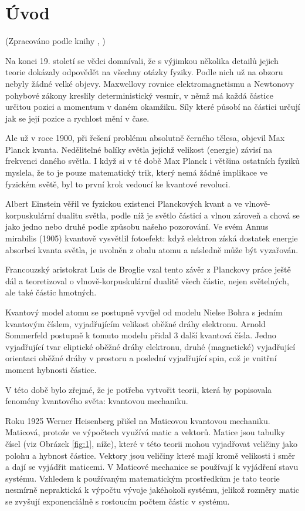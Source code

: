 \section{Úvod}
(Zpracováno podle knihy \citeauthor{quantum}, \citeyear{quantum})

Na konci 19. století se vědci domnívali, že s výjimkou několika detailů jejich teorie dokázaly odpovědět na všechny otázky fyziky. Podle nich už na obzoru nebyly žádné velké objevy. Maxwellovy rovnice elektromagnetismu a Newtonovy pohybové zákony kreslily deterministický vesmír, v němž má každá částice určitou pozici a momentum v daném okamžiku. Síly které působí na částici určují jak se její pozice a rychlost mění v čase.

Ale už v roce 1900, při řešení problému absolutně černého tělesa, objevil Max Planck kvanta. Nedělitelné balíky světla jejichž velikost (energie) závisí na frekvenci daného světla. I když si v té době Max Planck i většina ostatních fyziků myslela, že to je pouze matematický trik, který nemá žádné implikace ve fyzickém světě, byl to první krok vedoucí ke kvantové revoluci.

Albert Einstein věřil ve fyzickou existenci Planckových kvant a ve vlnově-korpuskulární dualitu světla, podle níž je světlo částicí a vlnou zároveň a chová se jako jedno nebo druhé podle způsobu našeho pozorování. Ve svém Annus mirabilis (1905) kvantově vysvětlil fotoefekt: když elektron získá dostatek energie absorbcí kvanta světla, je uvolněn z obalu atomu a následně může být vyzařován.

Francouzský aristokrat Luis de Broglie vzal tento závěr z Planckovy práce ještě dál a teoretizoval o vlnově-korpuskulární dualitě všech částic, nejen světelných, ale také částic hmotných.

Kvantový model atomu se postupně vyvíjel od modelu Nielse Bohra s jedním kvantovým číslem, vyjadřujícím velikost oběžné dráhy elektronu. Arnold Sommerfeld postupně k tomuto modelu přidal 3 další kvantová čísla. Jedno vyjadřující tvar eliptické oběžné dráhy elektronu, druhé (magnetické) vyjadřující orientaci oběžné dráhy v prostoru a poslední vyjadřující spin, což je vnitřní moment hybnosti částice.

V této době bylo zřejmé, že je potřeba vytvořit teorii, která by popisovala fenomény kvantového světa: kvantovou mechaniku.

Roku 1925 Werner Heisenberg přišel na Maticovou kvantovou mechaniku. Maticová, protože ve výpočtech využívá matic a vektorů. Matice jsou tabulky čísel (viz Obrázek \ref{fig:1}, níže), které v této teorii mohou vyjadřovat veličiny jako polohu a hybnost částice. Vektory jsou veličiny které mají kromě velikosti i směr a dají se vyjádřit maticemi. V Maticové mechanice se používají k vyjádření stavu systému. Vzhledem k používaným matematickým prostředkům je tato teorie nesmírně nepraktická k výpočtu vývoje jakéhokoli systému, jelikož rozměry matic se zvyšují exponenciálně s rostoucím počtem částic v systému.

